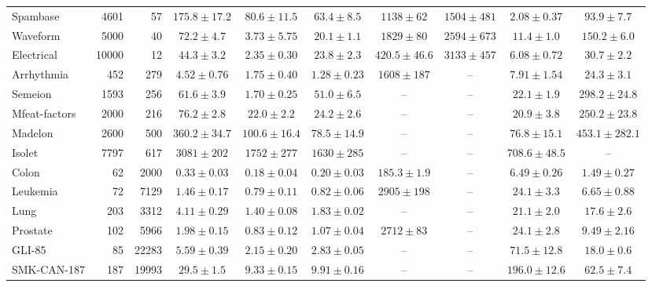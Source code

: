\begin{minipage}{\linewidth}
{\begin{tabular}{@{}lrr*{7}{c}@{}}
Spambase & 4601 & 57 & $175.8 \pm 17.2$ & $80.6 \pm 11.5$ & $63.4 \pm 8.5$ & $1138 \pm 62$ & $1504 \pm 481$ & $2.08 \pm 0.37$ & $93.9 \pm 7.7$ \\
Waveform & 5000 & 40 & $72.2 \pm 4.7$ & $3.73 \pm 5.75$ & $20.1 \pm 1.1$ & $1829 \pm 80$ & $2594 \pm 673$ & $11.4 \pm 1.0$ & $150.2 \pm 6.0$ \\
Electrical & 10000 & 12 & $44.3 \pm 3.2$ & $2.35 \pm 0.30$ & $23.8 \pm 2.3$ & $420.5 \pm 46.6$ & $3133 \pm 457$ & $6.08 \pm 0.72$ & $30.7 \pm 2.2$ \\
\midrule
Arrhythmia & 452 & 279 & $4.52 \pm 0.76$ & $1.75 \pm 0.40$ & $1.28 \pm 0.23$ & $1608 \pm 187$ & -- & $7.91 \pm 1.54$ & $24.3 \pm 3.1$ \\
Semeion & 1593 & 256 & $61.6 \pm 3.9$ & $1.70 \pm 0.25$ & $51.0 \pm 6.5$ & -- & -- & $22.1 \pm 1.9$ & $298.2 \pm 24.8$ \\
Mfeat-factors & 2000 & 216 & $76.2 \pm 2.8$ & $22.0 \pm 2.2$ & $24.2 \pm 2.6$ & -- & -- & $20.9 \pm 3.8$ & $250.2 \pm 23.8$ \\
Madelon & 2600 & 500 & $360.2 \pm 34.7$ & $100.6 \pm 16.4$ & $78.5 \pm 14.9$ & -- & -- & $76.8 \pm 15.1$ & $453.1 \pm 282.1$ \\
Isolet & 7797 & 617 & $3081 \pm 202$ & $1752 \pm 277$ & $1630 \pm 285$ & -- & -- & $708.6 \pm 48.5$ & -- \\
\midrule
Colon & 62 & 2000 & $0.33 \pm 0.03$ & $0.18 \pm 0.04$ & $0.20 \pm 0.03$ & $185.3 \pm 1.9$ & -- & $6.49 \pm 0.26$ & $1.49 \pm 0.27$ \\
Leukemia & 72 & 7129 & $1.46 \pm 0.17$ & $0.79 \pm 0.11$ & $0.82 \pm 0.06$ & $2905 \pm 198$ & -- & $24.1 \pm 3.3$ & $6.65 \pm 0.88$ \\
Lung & 203 & 3312 & $4.11 \pm 0.29$ & $1.40 \pm 0.08$ & $1.83 \pm 0.02$ & -- & -- & $21.1 \pm 2.0$ & $17.6 \pm 2.6$ \\
Prostate & 102 & 5966 & $1.98 \pm 0.15$ & $0.83 \pm 0.12$ & $1.07 \pm 0.04$ & $2712 \pm 83$ & -- & $24.1 \pm 2.8$ & $9.49 \pm 2.16$ \\
GLI-85 & 85 & 22283 & $5.59 \pm 0.39$ & $2.15 \pm 0.20$ & $2.83 \pm 0.05$ & -- & -- & $71.5 \pm 12.8$ & $18.0 \pm 0.6$ \\
SMK-CAN-187 & 187 & 19993 & $29.5 \pm 1.5$ & $9.33 \pm 0.15$ & $9.91 \pm 0.16$ & -- & -- & $196.0 \pm 12.6$ & $62.5 \pm 7.4$ \\
\bottomrule
\end{tabular}%
}
\end{minipage}\par
